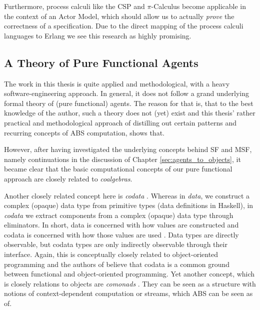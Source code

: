 Furthermore, process calculi like the CSP \cite{hoare_communicating_1985} and $\pi$-Calculus \cite{milner_communicating_1999} become applicable in the context of an Actor Model, which should allow us to actually \textit{prove} the correctness of a specification. Due to the direct mapping of the process calculi languages to Erlang we see this research as highly promising.

\subsection{A Theory of Pure Functional Agents}
The work in this thesis is quite applied and methodological, with a heavy software-engineering approach. In general, it does not follow a grand underlying formal theory of (pure functional) agents. The reason for that is, that to the best knowledge of the author, such a theory does not (yet) exist and this thesis' rather practical and methodological approach of distilling out certain patterns and recurring concepts of ABS computation, shows that.

However, after having investigated the underlying concepts behind SF and MSF, namely continuations in the discussion of Chapter \ref{sec:agents_to_objects}, it became clear that the basic computational concepts of our pure functional approach are closely related to \textit{coalgebras}. 

Another closely related concept here is \textit{codata} \cite{downen_codata_2019}. Whereas in \textit{data}, we construct a complex (opaque) data type from primitive types (data definitions in Haskell), in \textit{codata} we extract components from a complex (opaque) data type through eliminators. In short, data is concerned with how values are constructed and codata is concerned with how those values are used \cite{downen_codata_2019}. Data types are directly observable, but codata types are only indirectly observable through their interface. Again, this is conceptually closely related to object-oriented programming and the authors of \cite{downen_codata_2019} believe that codata is a common ground between functional and object-oriented programming. Yet another concept, which is closely relations to objects are \textit{comonads} \cite{uustalu_essence_2006}. They can be seen as a structure with notions of context-dependent computation or streams, which ABS can be seen as of.

